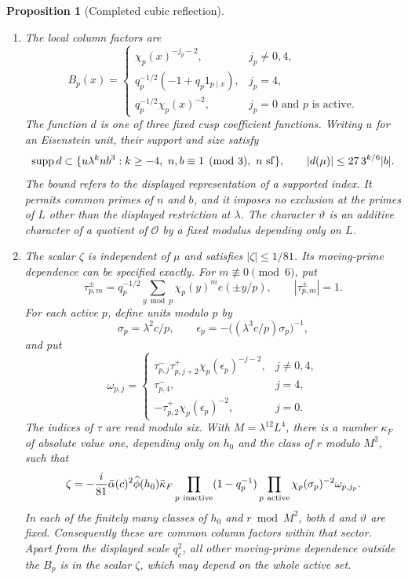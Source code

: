 \documentclass[11pt,a4paper]{article}
\numberwithin{equation}{section}
\numberwithin{figure}{section}
\newtheorem{proposition}[theorem]{Proposition}
\theoremstyle{definition}
\theoremstyle{remark}
\begin{document}
\begin{proposition}[Completed cubic reflection]
\begin{enumerate}
\item The local column factors are
\[
 B_p(x)=\begin{cases}
 \chi_p(x)^{-j_p-2},&j_p\ne0,4,\\
 q_p^{-1/2}(-1+q_p1_{p\mid x}),&j_p=4,\\
 q_p^{-1/2}\chi_p(x)^{-2},&j_p=0\text{ and }p\text{ is active}.
 \end{cases}
\]
The function $d$ is one of three fixed cusp coefficient functions.
Writing $u$ for an Eisenstein unit, their support and size satisfy
\begin{equation}
 \operatorname{supp}d\subset
 \{u\lambda^k n b^3:k\ge-4,\ n,b\equiv1\pmod3,\ n\ {\rm sf}\},
 \qquad |d(\mu)|\le27\,3^{k/6}|b|.
 \label{old-eq:4.3}
\end{equation}
The bound refers to the displayed representation of a supported index.
It permits common primes of $n$ and $b$, and it imposes no exclusion at
the primes of $L$ other than the displayed restriction at $\lambda$.
The character $\vartheta$ is an additive character of a quotient of
$\mathcal O$ by a fixed modulus depending only on $L$.

\item The scalar $\zeta$ is independent of $\mu$ and satisfies
$|\zeta|\le1/81$.  Its moving-prime dependence can be specified exactly.
For $m\not\equiv0\pmod6$, put
\[
 \tau_{p,m}^{\pm}=q_p^{-1/2}\sum_{y\bmod p}\chi_p(y)^m e(\pm y/p),
 \qquad |\tau_{p,m}^{\pm}|=1.
\]
For each active $p$, define units modulo $p$ by
\[
 \sigma_p=\lambda^2c/p,\qquad
 \epsilon_p=-\big((\lambda^3c/p)\sigma_p\big)^{-1},
\]
and put
\[
 \omega_{p,j}=\begin{cases}
 \tau_{p,j}^{-}\tau_{p,j+2}^{+}\chi_p(\epsilon_p)^{-j-2},&j\ne0,4,\\
 \tau_{p,4}^{-},&j=4,\\
 -\tau_{p,2}^{+}\chi_p(\epsilon_p)^{-2},&j=0.
 \end{cases}
\]
The indices of $\tau$ are read modulo six.  With
$M=\lambda^{12}L^4$, there is a number $\kappa_F$ of absolute value one,
depending only on $h_0$ and the class of $r$ modulo $M^2$, such that
\begin{equation}\label{eq:reflection-row-phase}
 \zeta=-\frac i{81}\bar\alpha(c)^2\widehat\phi(h_0)\bar\kappa_F
 \prod_{p\ {\rm inactive}}(1-q_p^{-1})
 \prod_{p\ {\rm active}}\chi_p(\sigma_p)^{-2}\omega_{p,j_p}.
\end{equation}
In each of the finitely many classes of $h_0$ and $r\bmod M^2$, both
$d$ and $\vartheta$ are fixed.  Consequently these are common column
factors within that sector.  Apart from the displayed scale $q_c^2$,
all other moving-prime dependence outside the $B_p$ is in the scalar
$\zeta$, which may depend on the whole active set.


\end{enumerate}
\end{proposition}
\end{document}
